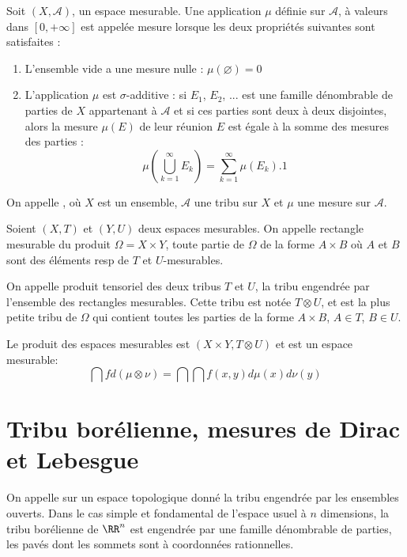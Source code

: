 \begin{definition}[Mesure]
\medskip
Soit $(X,\mathcal{A})$, un espace mesurable.
Une application $\mu$ définie sur $\mathcal{A}$, à valeurs dans $[0,+\infty]$ est appelée
mesure lorsque les deux propriétés suivantes sont satisfaites :
\begin{enumerate}
   \item L'ensemble vide a une mesure nulle : $\mu\left(\varnothing\right)=0$
   \item L'application $\mu$ est $\sigma$-additive :
si $E_1$, $E_2$, ... est une famille dénombrable de parties de $X$ appartenant à
$\mathcal{A}$ et si ces parties sont deux à deux disjointes, alors la mesure $\mu(E)$ de leur réunion
$E$ est égale à la somme des mesures des parties :
\begin{equation}
\mu\left(\bigcup_{k=1}^{\infty}E_{k}\right)=\sum_{k=1}^{\infty}\mu(E_{k}).1
\end{equation}
\end{enumerate}
\end{definition}

On appelle ,
  où $X$ est un ensemble, $\mathcal{A}$ une tribu sur
$X$ et $\mu$ une mesure sur $\mathcal{A}$.

\medskip
{}
Soient $(X,T)$ et $(Y,U)$ deux espaces mesurables.
On appelle rectangle mesurable du produit $\Omega=X\times Y$, toute partie de $\Omega$
de la forme $A\times B$ où $A$ et $B$ sont des éléments resp de $T$ et $U$-mesurables.

On appelle produit tensoriel des deux tribus $T$ et $U$, la tribu
engendrée par l'ensemble des rectangles mesurables.
Cette tribu est notée $T \otimes U$, et est la plus petite tribu de $\Omega$ qui contient
toutes les parties de la forme $A\times B$, $A\in T$, $B\in U$.

Le produit des espaces mesurables est $(X\times Y, T \otimes U)$ et est un espace mesurable:
\begin{equation}
\dint fd(\mu \otimes \nu) = \dint\dint f(x,y) d\mu(x)d\nu(y)
\end{equation}

\medskip
\section{Tribu borélienne, mesures de Dirac et Lebesgue}

\begin{definition}
On appelle  sur un espace topologique donné la tribu engendrée par les
ensembles ouverts.
Dans le cas simple et fondamental de l'espace usuel à $n$ dimensions, la tribu borélienne de $\RR^n$
est engendrée par une famille dénombrable de parties, les pavés dont les sommets sont à
coordonnées rationnelles.
\end{definition}

